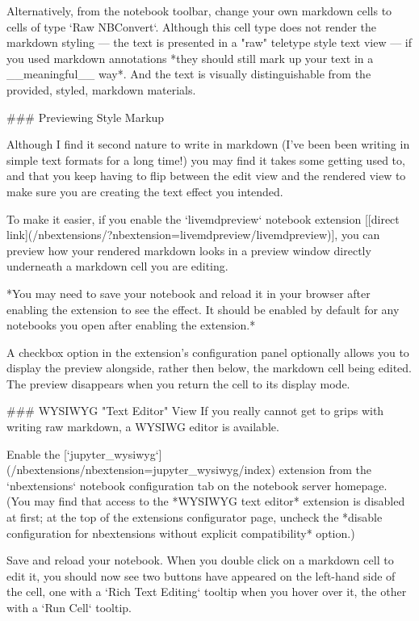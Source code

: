 \documentclass[letterpaper,10pt,english]{sphinxmanual}
\begin{document}
Alternatively, from the notebook toolbar, change your own markdown cells to cells of type `Raw NBConvert`. Although this cell type does not render the markdown styling — the text is presented in a "raw" teletype style text view —  if you used markdown annotations *they should still mark up your text in a __meaningful__ way*. And the text is visually distinguishable from the provided, styled, markdown materials.

### Previewing Style Markup

Although I find it second nature to write in markdown (I've been been writing in simple text formats for a long time!) you may find it takes some getting used to, and that you keep having to flip between the edit view and the rendered view to make sure you are creating the text effect you intended.

To make it easier, if you enable the `livemdpreview` notebook extension [[direct link](/nbextensions/?nbextension=livemdpreview/livemdpreview)], you can preview how your rendered markdown looks in a preview window directly underneath a markdown cell you are editing.

*You may need to save your notebook and reload it in your browser after enabling the extension to see the effect. It should be enabled by default for any notebooks you open after enabling the extension.*

A checkbox option in the extension's configuration panel optionally allows you to display the preview alongside, rather then below, the markdown cell being edited. The preview disappears when you return the cell to its display mode.


### WYSIWYG "Text Editor" View
If you really cannot get to grips with writing raw markdown, a WYSIWG editor is available.

Enable the [`jupyter_wysiwyg`](/nbextensions/nbextension=jupyter_wysiwyg/index) extension from the `nbextensions` notebook configuration tab on the notebook server homepage. (You may find that access to the *WYSIWYG text editor* extension is disabled at first; at the top of the extensions configurator page, uncheck the *disable configuration for nbextensions without explicit compatibility* option.)

Save and reload your notebook. When you double click on a markdown cell to edit it, you should now see two buttons have appeared on the left-hand side of the cell, one with a `Rich Text Editing` tooltip when you hover over it, the other with a `Run Cell` tooltip.
\end{document}
